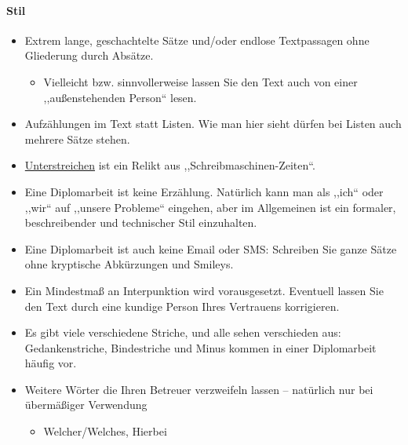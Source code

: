 \documentclass[a4paper,ngerman,naustrian,DIV=12,BCOR=1cm]{scrbook}
\begin{document}
\paragraph{Stil}
\begin{itemize}
\item Extrem lange, geschachtelte Sätze und/oder endlose Textpassagen ohne
Gliederung durch Absätze.\nopagebreak

\begin{itemize}
\item Vielleicht bzw. sinnvollerweise lassen Sie den Text auch von einer
,,außenstehenden Person`` lesen. 
\end{itemize}
\item Aufzählungen im Text statt Listen. Wie man hier sieht dürfen bei Listen
auch mehrere Sätze stehen.
\item \uline{Unterstreichen} ist ein Relikt aus ,,Schreibmaschinen-Zeiten``.
\item Eine Diplomarbeit ist keine Erzählung. Natürlich kann man als ,,ich``
oder ,,wir`` auf ,,unsere Probleme`` eingehen, aber im Allgemeinen
ist ein formaler, beschreibender und technischer Stil einzuhalten.
\item Eine Diplomarbeit ist auch keine Email oder SMS: Schreiben Sie ganze
Sätze ohne kryptische Abkürzungen und Smileys.
\item Ein Mindestmaß an Interpunktion wird vorausgesetzt. Eventuell lassen
Sie den Text durch eine kundige Person Ihres Vertrauens korrigieren.
\item Es gibt viele verschiedene Striche, und alle sehen verschieden aus:
Gedankenstriche, Bindestriche und Minus kommen in einer Diplomarbeit
häufig vor.
\item Weitere Wörter die Ihren Betreuer verzweifeln lassen -- natürlich
nur bei übermäßiger Verwendung

\begin{itemize}
\item Welcher/Welches, Hierbei
\end{itemize}
\end{itemize}
\end{document}
